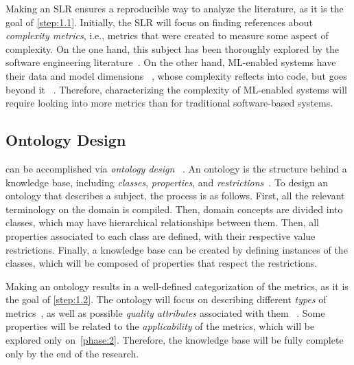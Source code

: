   Making an SLR ensures a reproducible way to analyze the literature,
  as it is the goal of \cref{step:1.1}. Initially, the SLR will focus on
  finding references about \emph{complexity metrics}, i.e., metrics that
  were created to measure some aspect of complexity. On the one hand,
  this subject has been thoroughly explored by the software engineering
  literature~\parencite{Fenton2014SoftwareEdition,Tu2009TheMetrics}.
  On the other hand, ML-enabled systems have their data and model dimensions%
  ~\parencite{Alves2024PracticesReview,Sato2019ContinuousLearning},
  whose complexity reflects into code, but goes beyond it%
  ~\parencite{ElAlaoui2019BigApproaches,Polancic2017ComplexityReview}.
  Therefore, characterizing the complexity of ML-enabled systems will
  require looking into more metrics than for traditional software-based
  systems.

  \subsection{Ontology Design}
  \MethodologyStep


   can be accomplished via \emph{ontology design}%
  ~\parencite{Iqbal2013AnReview,NoyOntologyOntology}. An ontology
  is the structure behind a knowledge base, including \emph{classes},
  \emph{properties}, and \emph{restrictions}~\parencite{NoyOntologyOntology}.
  To design an ontology that describes a subject, the process is as follows.
  First, all the relevant terminology on the domain is compiled. Then,
  domain concepts are divided into classes, which may have hierarchical
  relationships between them. Then, all properties associated to each
  class are defined, with their respective value restrictions. Finally,
  a knowledge base can be created by defining instances of the classes,
  which will be composed of properties that respect the restrictions.

  Making an ontology results in a well-defined categorization of the metrics,
  as it is the goal of \cref{step:1.2}. The ontology will focus on describing
  different \emph{types} of metrics~\parencite{Fenton2014SoftwareEdition},
  as well as possible \emph{quality attributes} associated with them%
  ~\parencite{Latva-Koivisto2001FindingModels}. Some properties will be
  related to the \emph{applicability} of the metrics, which will be explored
  only on~\cref{phase:2}. Therefore, the knowledge base will be fully complete
  only by the end of the research.

